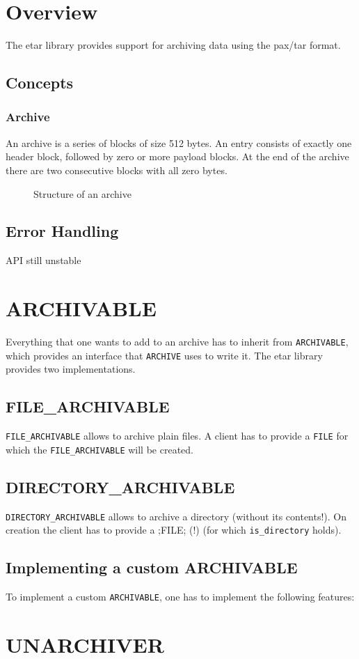 \documentclass[a4paper]{report}
\begin{document}
\chapter{Overview}
The etar library provides support for archiving data using the pax/tar format.

\section{Concepts}
\subsection{Archive}
An archive is a series of blocks of size 512 bytes. An entry consists of exactly
one header block, followed by zero or more payload blocks. At the end of the
archive there are two consecutive blocks with all zero bytes.

\begin{figure}[h]
	\begin{center}
		
	\end{center}
	\caption{Structure of an archive}
\end{figure}

\section{Error Handling}
API still unstable




\chapter{ARCHIVABLE}
Everything that one wants to add to an archive has to inherit from
\lstinline;ARCHIVABLE;, which provides an interface that \lstinline;ARCHIVE;
uses to write it. The etar library provides two implementations.

\section{FILE\_ARCHIVABLE}
\lstinline;FILE_ARCHIVABLE; allows to archive plain files. A client has to
provide a \lstinline;FILE; for which the \lstinline;FILE_ARCHIVABLE; will be
created.

\section{DIRECTORY\_ARCHIVABLE}
\lstinline;DIRECTORY_ARCHIVABLE; allows to archive a directory (without its
contents!). On creation the client has to provide a \lstiinline;FILE; (!) (for
which \lstinline;is_directory; holds).

\section{Implementing a custom ARCHIVABLE}
To implement a custom \lstinline;ARCHIVABLE;, one has to implement the following
features:



\chapter{UNARCHIVER}
\end{document}

